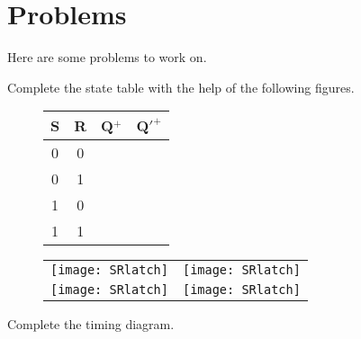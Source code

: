 


\pagebreak
\section{Problems}
Here are some problems to work on.
\begin{description}
\item[Complete the state table with the help of the following figures.]

\begin{tabular}{c|c||c|c}
S & R & Q$^+$ & Q$'^+$ \\ \hline
0 & 0 &  &  \\ \hline
0 & 1 &  &  \\ \hline
1 & 0 &  &  \\ \hline
1 & 1 &  &  \\
\end{tabular}

\begin{tabular}{p{2in} p{2in}}
\texttt{[image: SRlatch]} & \texttt{[image: SRlatch]} \\ 
\texttt{[image: SRlatch]} & \texttt{[image: SRlatch]} \\
\end{tabular}

\vspace{0.2in} 

\item[Complete the timing diagram.]

\end{description}

